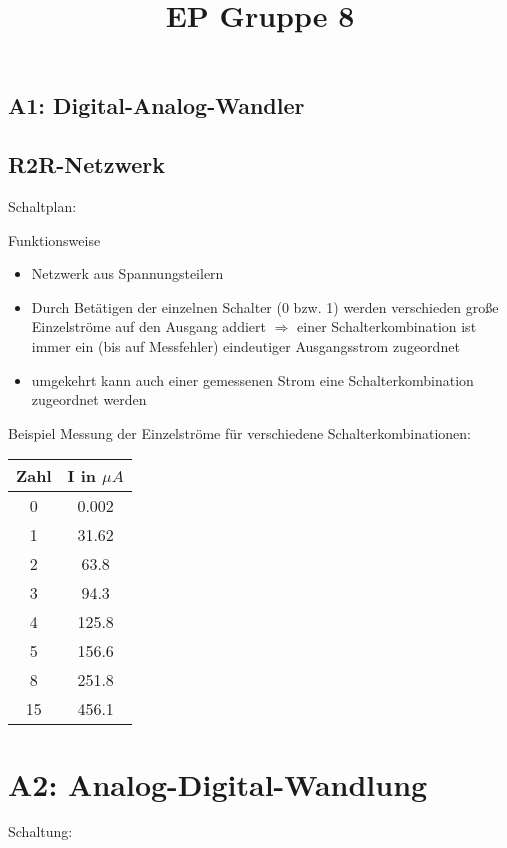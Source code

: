 \documentclass[compress,11pt]{beamer}
\title{EP Gruppe 8}
\begin{document}
\begin{frame}

\section{A1: Digital-Analog-Wandler}

\subsection{R2R-Netzwerk}
Schaltplan:

\begin{block}{Funktionsweise}
\begin{itemize}
\item Netzwerk aus Spannungsteilern
\item Durch Betätigen der einzelnen Schalter (0 bzw. 1) werden verschieden große Einzelströme auf den Ausgang addiert $\Rightarrow$ einer Schalterkombination ist immer ein (bis auf Messfehler) eindeutiger Ausgangsstrom zugeordnet 
\item umgekehrt kann auch einer gemessenen Strom eine Schalterkombination zugeordnet werden
\end{itemize}
\end{block}

\end{frame}
\begin{frame}{Beispiel}
Messung der Einzelströme für verschiedene Schalterkombinationen:
\begin{tabular}{|c|c|}
\hline
Zahl & I in $\mu A$  \\
\hline
0 & 0.002 \\
1 & 31.62 \\
2 & 63.8 \\
3 & 94.3 \\
4 & 125.8 \\
5 & 156.6 \\
8 & 251.8 \\
15 & 456.1 \\
\hline
\end{tabular}


\end{frame}
\subsection{}








\section{A2: Analog-Digital-Wandlung}
\begin{frame}
Schaltung:
\end{frame}
\end{document}
